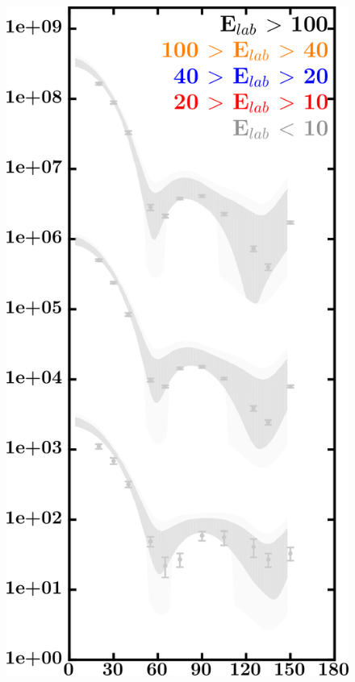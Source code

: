 \documentclass[twocolumn,secnumarabic,amssymb, nobibnotes, aps, prl,
superscriptaddress, nobalancelastpage]{revtex4}
\begin{document}
\begin{figure}[!htb]
\begin{minipage}{0.4\linewidth}
        \includegraphics[width=\linewidth]{figures/ni64_neutronElastic.png}
        \label{DOM_ni64_neutron_elastic}
    \end{minipage}
    \centering
    \begin{minipage}{0.4\linewidth}
        \centering

\end{minipage}
\end{figure}
\end{document}
